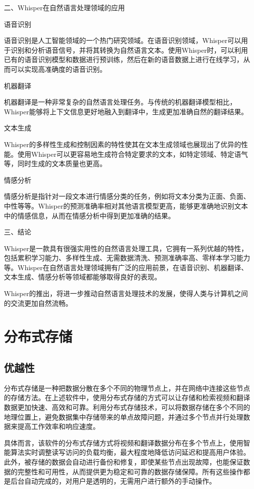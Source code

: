 二、Whisper在自然语言处理领域的应用

语音识别

语音识别是人工智能领域的一个热门研究领域。在语音识别领域，Whisper可以用于识别和分析语音信号，并将其转换为自然语言文本。使用Whisper时，可以利用已有的语音识别模型和数据进行预训练，然后在新的语音数据上进行在线学习，从而可以实现高准确度的语音识别。

机器翻译

机器翻译是一种非常复杂的自然语言处理任务。与传统的机器翻译模型相比，Whisper能够将上下文信息更好地融入到翻译中，生成更加准确自然的翻译结果。

文本生成

Whisper的多样性生成和控制因素的特性使其在文本生成领域也展现出了优异的性能。使用Whisper可以更容易地生成符合特定要求的文本，如特定领域、特定语气等，同时生成的文本质量也更高。

情感分析

情感分析是指针对一段文本进行情感分类的任务，例如将文本分类为正面、负面、中性等等。Whisper的预测准确率相对其他语言模型更高，能够更准确地识别文本中的情感信息，从而在情感分析中得到更加准确的结果。

三、结论

Whisper是一款具有很强实用性的自然语言处理工具，它拥有一系列优越的特性，包括累积学习能力、多样性生成、无需数据清洗、预测准确率高、零样本学习能力等。Whisper在自然语言处理领域拥有广泛的应用前景，在语音识别、机器翻译、文本生成、情感分析等领域都能够取得良好的表现。

Whisper的推出，将进一步推动自然语言处理技术的发展，使得人类与计算机之间的交流更加自然流畅。

\section{分布式存储}

\subsection{优越性}

分布式存储是一种把数据分散在多个不同的物理节点上，并在网络中连接这些节点的存储方法。在上述软件中，使用分布式存储的方式可以让存储和检索视频和翻译数据更加快速、高效和可靠。利用分布式存储技术，可以将数据存储在多个不同的地理位置上，避免数据集中存储带来的单点故障问题，并通过多个节点并行处理数据来提高工作效率和响应速度。

具体而言，该软件的分布式存储方式将视频和翻译数据分布在多个节点上，使用智能算法实时调整读写访问的负载均衡，最大程度地降低访问延迟和提高用户体验。此外，被存储的数据会自动进行备份和修复，即使某些节点出现故障，也能保证数据的完整性和可用性，从而提供更为稳定和可靠的数据存储保障。所有这些操作都是后台自动完成的，对用户是透明的，无需用户进行额外的手动操作。

